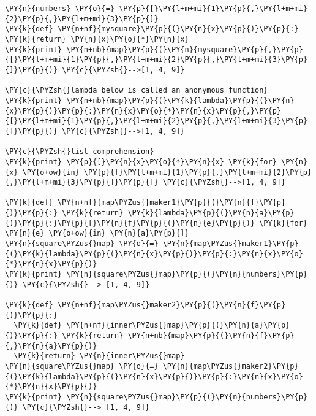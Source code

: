 \begin{Verbatim}[commandchars=\\\{\}]
\PY{n}{numbers} \PY{o}{=} \PY{p}{[}\PY{l+m+mi}{1}\PY{p}{,}\PY{l+m+mi}{2}\PY{p}{,}\PY{l+m+mi}{3}\PY{p}{]}
\PY{k}{def} \PY{n+nf}{mysquare}\PY{p}{(}\PY{n}{x}\PY{p}{)}\PY{p}{:} \PY{k}{return} \PY{n}{x}\PY{o}{*}\PY{n}{x}
\PY{k}{print} \PY{n+nb}{map}\PY{p}{(}\PY{n}{mysquare}\PY{p}{,}\PY{p}{[}\PY{l+m+mi}{1}\PY{p}{,}\PY{l+m+mi}{2}\PY{p}{,}\PY{l+m+mi}{3}\PY{p}{]}\PY{p}{)} \PY{c}{\PYZsh{}-->[1, 4, 9]}

\PY{c}{\PYZsh{}lambda below is called an anonymous function}
\PY{k}{print} \PY{n+nb}{map}\PY{p}{(}\PY{k}{lambda}\PY{p}{(}\PY{n}{x}\PY{p}{)}\PY{p}{:}\PY{n}{x}\PY{o}{*}\PY{n}{x}\PY{p}{,}\PY{p}{[}\PY{l+m+mi}{1}\PY{p}{,}\PY{l+m+mi}{2}\PY{p}{,}\PY{l+m+mi}{3}\PY{p}{]}\PY{p}{)} \PY{c}{\PYZsh{}-->[1, 4, 9]}

\PY{c}{\PYZsh{}list comprehension}
\PY{k}{print} \PY{p}{[}\PY{n}{x}\PY{o}{*}\PY{n}{x} \PY{k}{for} \PY{n}{x} \PY{o+ow}{in} \PY{p}{[}\PY{l+m+mi}{1}\PY{p}{,}\PY{l+m+mi}{2}\PY{p}{,}\PY{l+m+mi}{3}\PY{p}{]}\PY{p}{]} \PY{c}{\PYZsh{}-->[1, 4, 9]}

\PY{k}{def} \PY{n+nf}{map\PYZus{}maker1}\PY{p}{(}\PY{n}{f}\PY{p}{)}\PY{p}{:} \PY{k}{return} \PY{k}{lambda}\PY{p}{(}\PY{n}{a}\PY{p}{)}\PY{p}{:}\PY{p}{[}\PY{n}{f}\PY{p}{(}\PY{n}{e}\PY{p}{)} \PY{k}{for} \PY{n}{e} \PY{o+ow}{in} \PY{n}{a}\PY{p}{]}
\PY{n}{square\PYZus{}map} \PY{o}{=} \PY{n}{map\PYZus{}maker1}\PY{p}{(}\PY{k}{lambda}\PY{p}{(}\PY{n}{x}\PY{p}{)}\PY{p}{:}\PY{n}{x}\PY{o}{*}\PY{n}{x}\PY{p}{)}
\PY{k}{print} \PY{n}{square\PYZus{}map}\PY{p}{(}\PY{n}{numbers}\PY{p}{)} \PY{c}{\PYZsh{}--> [1, 4, 9]}

\PY{k}{def} \PY{n+nf}{map\PYZus{}maker2}\PY{p}{(}\PY{n}{f}\PY{p}{)}\PY{p}{:}
  \PY{k}{def} \PY{n+nf}{inner\PYZus{}map}\PY{p}{(}\PY{n}{a}\PY{p}{)}\PY{p}{:} \PY{k}{return} \PY{n+nb}{map}\PY{p}{(}\PY{n}{f}\PY{p}{,}\PY{n}{a}\PY{p}{)}
  \PY{k}{return} \PY{n}{inner\PYZus{}map}
\PY{n}{square\PYZus{}map} \PY{o}{=} \PY{n}{map\PYZus{}maker2}\PY{p}{(}\PY{k}{lambda}\PY{p}{(}\PY{n}{x}\PY{p}{)}\PY{p}{:}\PY{n}{x}\PY{o}{*}\PY{n}{x}\PY{p}{)}
\PY{k}{print} \PY{n}{square\PYZus{}map}\PY{p}{(}\PY{n}{numbers}\PY{p}{)} \PY{c}{\PYZsh{}--> [1, 4, 9]}
\end{Verbatim}
